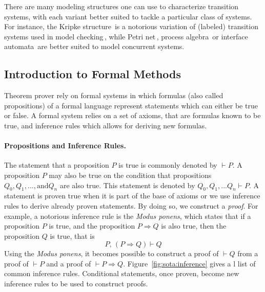 There are many modeling structures one can use to characterize transition
systems, with each variant better suited to tackle a particular class of
systems.
%
For instance, the Kripke structure\,\cite{kripke1971semantical} is a notorious
variation of (labeled) transition systems used in model
checking\,\cite{clarke1999model}, while Petri net\,\cite{peterson1981petri},
process algebra\,\cite{bergstra1984process} or interface
automata\,\cite{de2001interface} are better suited to model concurrent systems.

\subsection{Introduction to Formal Methods}
\label{subsec:sota:fm}

Theorem prover rely on formal systems in which formulas (also called
propositions) of a formal language represent statements which can either be true
or false.
%
A formal system relies on a set of axioms, that are formulas known to be true,
and inference rules which allows for deriving new formulas.

\paragraph{Propositions and Inference Rules.}
%
The statement that a proposition \( P \) is true is commonly denoted by
\( \vdash P \).
%
A proposition \( P \) may also be true on the condition that propositions
\( Q_0, Q_1, ..., \text{and} Q_n \) are also true.
%
This statement is denoted by \( Q_0, Q_1, ... Q_n \vdash P \).
%
A statement is proven true when it is part of the base of axioms or we use
inference rules to derive already proven statements.
%
By doing so, we construct a \emph{proof}.
%
For example, a notorious inference rule is the \emph{Modus ponens}, which states
that if a proposition \( P \) is true, and the proposition \( P \Rightarrow Q \)
is also true, then the proposition \( Q \) is true, that is
%
\[
  P\text{, }(P \Rightarrow Q) \vdash Q
\]
%
Using the \emph{Modus ponens}, it becomes possible to construct a proof of
\( \vdash Q \) from a proof of \( \vdash P \) and a proof of
\( \vdash P \Rightarrow Q \).
%
Figure~\ref{fig:sota:inference} gives a l list of common inference rules.
%
Conditional statements, once proven, become new inference rules to be used to
construct proofs.

